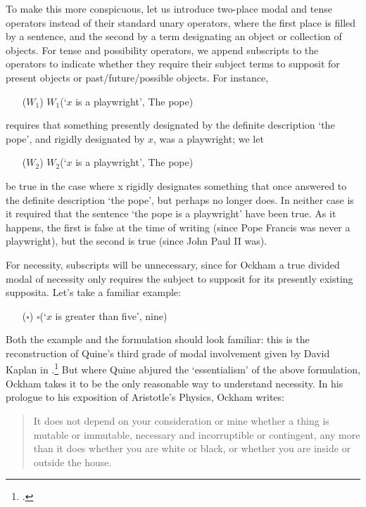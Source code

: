 \documentclass[]{article}
\begin{document}
To make this more conspicuous, let us introduce two-place modal and tense operators instead of their standard unary operators, where the first place is filled by a sentence, and the second by a term designating an object or collection of objects. For tense and possibility operators, we append subscripts to the operators to indicate whether they require their subject terms to supposit for present objects or past/future/possible objects. For instance, 

\begin{enumerate}
	\item[($W_{1}$)] $W_{1}$(`$x$ is a playwright', The pope)
\end{enumerate}

\noindent requires that something presently designated by the definite description `the pope', and rigidly designated by $x$, was a playwright; we let

\begin{enumerate}
	\item[($W_{2}$)] $W_{2}$(`$x$ is a playwright', The pope)
\end{enumerate}

\noindent be true in the case where x rigidly designates something that once answered to the definite description `the pope', but perhaps no longer does. In neither case is it required that the sentence `the pope is a playwright' have been true. As it happens, the first is false at the time of writing (since Pope Francis was never a playwright), but the second is true (since John Paul II was).

For necessity, subscripts will be unnecessary, since for Ockham a true divided modal of necessity only requires the subject to supposit for its presently existing supposita. Let's take a familiar example:
\begin{enumerate}
	\item[($\square$)] $\square$(`$x$ is greater than five', nine)
\end{enumerate}

Both the example and the formulation should look familiar: this is the reconstruction of Quine's third grade of modal involvement given by David Kaplan in \cite{Kaplan1968}.\footnote{\cite{Quine1976}.} But where Quine abjured the `essentialism' of the above formulation, Ockham takes it to be the only reasonable way to understand necessity. In his prologue to his exposition of Aristotle's Physics, Ockham writes: 

\begin{quote}
	It does not depend on your consideration or mine whether a thing is mutable or immutable, necessary and incorruptible or contingent, any more than it does whether you are white or black, or whether you are inside or outside the house. \cite[p. 14, alt.]{Ockham1957}
\end{quote}
\end{document}
